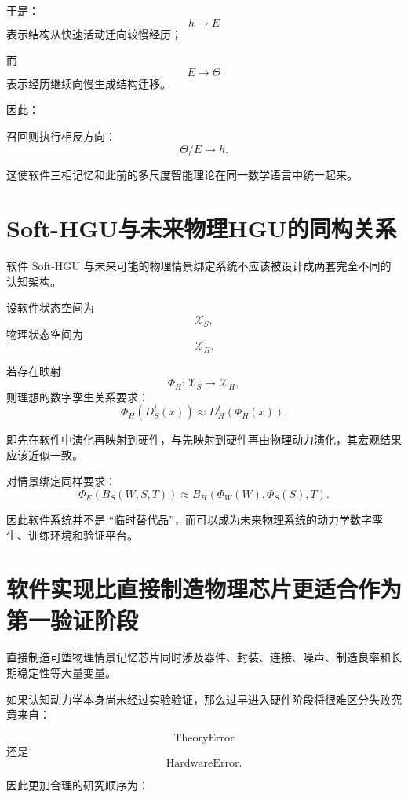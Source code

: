 于是：
\[
h\rightarrow E
\]
表示结构从快速活动迁向较慢经历；

而
\[
E\rightarrow\Theta
\]
表示经历继续向慢生成结构迁移。

因此：
\begin{statementbox}
\centering
{}
\end{statementbox}

召回则执行相反方向：
\[
\Theta/E
\rightarrow
h.
\]

这使软件三相记忆和此前的多尺度智能理论在同一数学语言中统一起来。

\section{Soft-HGU与未来物理HGU的同构关系}

软件 Soft-HGU 与未来可能的物理情景绑定系统不应该被设计成两套完全不同的认知架构。

设软件状态空间为
\[
\mathcal X_S,
\]
物理状态空间为
\[
\mathcal X_H.
\]

若存在映射
\[
\Phi_H:
\mathcal X_S
\rightarrow
\mathcal X_H,
\]
则理想的数字孪生关系要求：
\[
\boxed{
\Phi_H
\left(
D_S^t(x)
\right)
\approx
D_H^t
\left(
\Phi_H(x)
\right).
}
\]

即先在软件中演化再映射到硬件，与先映射到硬件再由物理动力演化，其宏观结果应该近似一致。

对情景绑定同样要求：
\[
\Phi_E
\left(
B_S(W,S,T)
\right)
\approx
B_H
\left(
\Phi_W(W),
\Phi_S(S),
T
\right).
\]

因此软件系统并不是 ``临时替代品''，而可以成为未来物理系统的动力学数字孪生、训练环境和验证平台。

\section{软件实现比直接制造物理芯片更适合作为第一验证阶段}

直接制造可塑物理情景记忆芯片同时涉及器件、封装、连接、噪声、制造良率和长期稳定性等大量变量。

如果认知动力学本身尚未经过实验验证，那么过早进入硬件阶段将很难区分失败究竟来自：

\[
\mathrm{TheoryError}
\]
还是
\[
\mathrm{HardwareError}.
\]

因此更加合理的研究顺序为：
\begin{statementbox}
\centering
{}
\end{statementbox}

